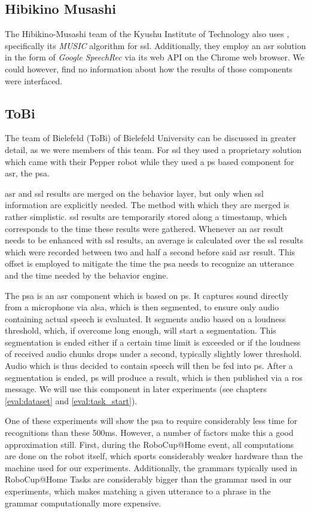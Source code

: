\subsection{Hibikino Musashi}
The Hibikino-Musashi team of the Kyushu Institute of Technology also uses \HARK, specifically its \textit{MUSIC} algorithm for \gls{ssl}.
Additionally, they employ an \gls{asr} solution in the form of \textit{Google SpeechRec} via its web API on the Chrome web browser.
We could however, find no information about how the results of those components were interfaced.

\subsection{ToBi}
The team of Bielefeld (ToBi) of Bielefeld University can be discussed in greater detail, as we were members of this team.
For \gls{ssl} they used a proprietary solution which came with their Pepper robot %
while they used a \gls{ps} based component for \gls{asr}, the \gls{psa}. 

\gls{asr} and \gls{ssl} results are merged on the behavior layer, but only when \gls{ssl} information are explicitly needed.
The method with which they are merged is rather simplistic.
\gls{ssl} results are temporarily stored along a timestamp, which corresponds to the time these results were gathered.
Whenever an \gls{asr} result needs to be enhanced with \gls{ssl} results, an average is calculated over the \gls{ssl} results which were recorded between two and half a second before said \gls{asr} result.
This offset is employed to mitigate the time the \gls{psa} needs to recognize an utterance and the time needed by the behavior engine. 

The \gls{psa} is an \gls{asr} component which is based on \gls{ps}. \label{related_work:psa}
It captures sound directly from a microphone via \gls{alsa}, which is then segmented, to ensure only audio containing actual speech is evaluated.
It segments audio based on a loudness threshold, which, if overcome long enough, will start a segmentation.
This segmentation is ended either if a certain time limit is exceeded or if the loudness of received audio chunks drops under a second, typically slightly lower threshold.
Audio which is thus decided to contain speech will then be fed into \gls{ps}.
After a segmentation is ended, \gls{ps} will produce a result, which is then published via a \gls{ros} message.
We will use this component in later experiments (see chapters \ref{eval:dataset} and \ref{eval:task_start}).

One of these experiments will show the \gls{psa} to require considerably less time for recognitions than these 500ms.
However, a number of factors make this a good approximation still.
First, during the RoboCup@Home event, all computations are done on the robot itself, which sports considerably weaker hardware than the machine used for our experiments.
Additionally, the grammars typically used in RoboCup@Home Tasks are considerably bigger than the grammar used in our experiments, which makes matching a given utterance to a phrase in the grammar computationally more expensive.
